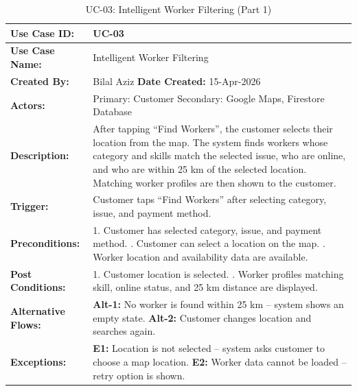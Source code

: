 {\small
\renewcommand{\arraystretch}{1.05}
\begin{table}[H]
\centering
\begin{tabular}{|p{3cm}|p{11.2cm}|}
\hline
\textbf{Use Case ID:} & UC-03 \\ \hline
\textbf{Use Case Name:} & Intelligent Worker Filtering \\ \hline
\textbf{Created By:} & Bilal Aziz \hfill \textbf{Date Created:} 15-Apr-2026 \\ \hline
\textbf{Actors:} & Primary: Customer \quad Secondary: Google Maps, Firestore Database \\ \hline
\textbf{Description:} & After tapping ``Find Workers'', the customer selects their location from the map. The system finds workers whose category and skills match the selected issue, who are online, and who are within 25 km of the selected location. Matching worker profiles are then shown to the customer. \\ \hline
\textbf{Trigger:} & Customer taps ``Find Workers'' after selecting category, issue, and payment method. \\ \hline
\textbf{Preconditions:} & 1. Customer has selected category, issue, and payment method. \newline 2. Customer can select a location on the map. \newline 3. Worker location and availability data are available. \\ \hline
\textbf{Post Conditions:} & 1. Customer location is selected. \newline 2. Worker profiles matching skill, online status, and 25 km distance are displayed. \\ \hline
\textbf{Alternative Flows:} & \textbf{Alt-1:} No worker is found within 25 km -- system shows an empty state. \newline \textbf{Alt-2:} Customer changes location and searches again. \\ \hline
\textbf{Exceptions:} & \textbf{E1:} Location is not selected -- system asks customer to choose a map location. \newline \textbf{E2:} Worker data cannot be loaded -- retry option is shown. \\ \hline
\end{tabular}
\caption*{UC-03: Intelligent Worker Filtering (Part 1)}
\end{table}
}

\newpage

